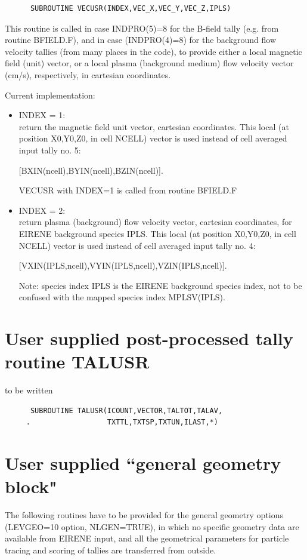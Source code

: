 \begin{verbatim}
      SUBROUTINE VECUSR(INDEX,VEC_X,VEC_Y,VEC_Z,IPLS)
\end{verbatim}
This routine is called in case INDPRO(5)=8 for the B-field tally (e.g. from routine BFIELD.F), and in case (INDPRO(4)=8)
for the background flow velocity tallies (from many places in the code),
to provide either a local magnetic field (unit) vector, or a local plasma (background medium)
flow velocity vector (cm/s), respectively, in cartesian coordinates.

Current implementation:
\begin{itemize}
\item
INDEX = 1:   \\
return the magnetic field unit vector, cartesian coordinates. This local (at position X0,Y0,Z0, in cell NCELL) vector is used
instead of cell averaged input tally no. 5:

[BXIN(ncell),BYIN(ncell),BZIN(ncell)].

VECUSR with INDEX=1 is called from routine BFIELD.F
\item
INDEX = 2:   \\
return plasma (background) flow velocity vector, cartesian coordinates, for EIRENE background species IPLS.
This local (at position X0,Y0,Z0, in cell NCELL) vector is used
instead of cell averaged input tally no. 4:

[VXIN(IPLS,ncell),VYIN(IPLS,ncell),VZIN(IPLS,ncell)].

Note: species index IPLS is the EIRENE background species index, not to be confused with the mapped species index MPLSV(IPLS).
\end{itemize}

\section{User supplied post-processed tally routine TALUSR}
\label{sec3.7}
to be written
\begin{verbatim}
      SUBROUTINE TALUSR(ICOUNT,VECTOR,TALTOT,TALAV,
     .                  TXTTL,TXTSP,TXTUN,ILAST,*)
\end{verbatim}
\section{User supplied ``general geometry block"}
\label{sec3.8} The following routines have to be provided for the
general geometry options (LEVGEO=10 option, NLGEN=TRUE), in which no
specific geometry data are available from EIRENE input, and all the
geometrical parameters for particle tracing and scoring of tallies
are transferred from outside.

